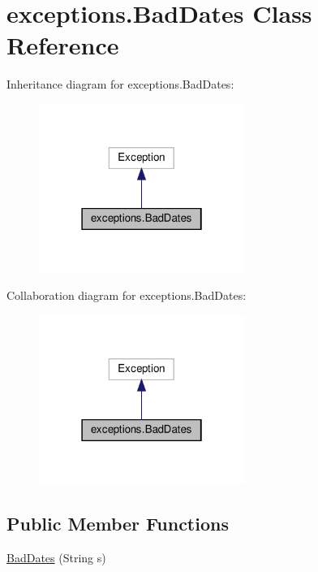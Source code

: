 \hypertarget{classexceptions_1_1_bad_dates}{}\section{exceptions.\+Bad\+Dates Class Reference}
\label{classexceptions_1_1_bad_dates}


Inheritance diagram for exceptions.\+Bad\+Dates\+:
\nopagebreak
\begin{figure}[H]
\begin{center}
\leavevmode
\includegraphics[width=190pt]{classexceptions_1_1_bad_dates__inherit__graph}
\end{center}
\end{figure}


Collaboration diagram for exceptions.\+Bad\+Dates\+:
\nopagebreak
\begin{figure}[H]
\begin{center}
\leavevmode
\includegraphics[width=190pt]{classexceptions_1_1_bad_dates__coll__graph}
\end{center}
\end{figure}
\subsection*{Public Member Functions}
\begin{DoxyCompactItemize}
\item 
\mbox{\hyperlink{classexceptions_1_1_bad_dates_a34213c984892e85612e3a2e44220e896}{Bad\+Dates}} (String s)
\end{DoxyCompactItemize}


